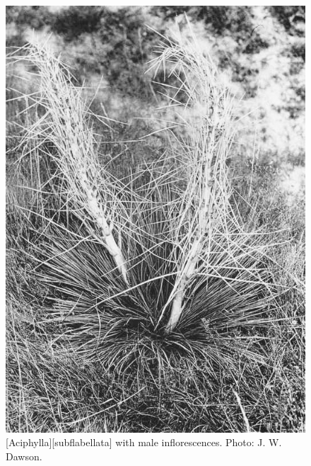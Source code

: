 \begin{figure}[t]
	\begin{minipage}[t]{\textwidth}
		\begin{minipage}[t]{(\textwidth-\fgap) * \real{0.523}}
			\centering
			\includegraphics[width=\textwidth]{graphics/fig_084}
			\caption[\emph{Aciphylla subflabellata with male inflorescencs}]{[Aciphylla][subflabellata] with male inflorescences.
			Photo:  J. W. Dawson.}%
			\label{fig:84aciphylla}
		\end{minipage}\hspace{\fgap}%
		\begin{minipage}[t]{(\textwidth-\fgap) * \real{0.477}}
			\centering

\end{minipage}
\end{minipage}
\end{figure}
